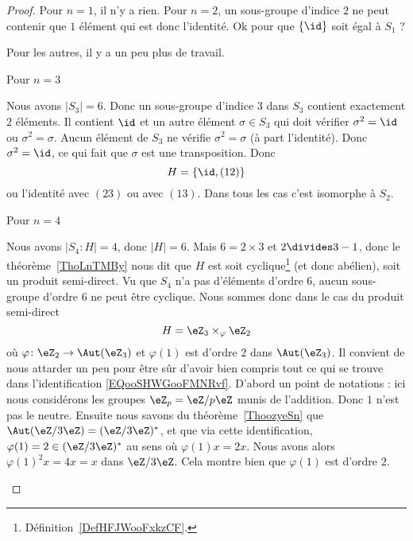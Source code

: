 \begin{proof}
    Pour \( n=1\), il n'y a rien. Pour \( n=2\), un sous-groupe d'indice \( 2\) ne peut contenir que \( 1\) élément qui est donc l'identité. Ok pour que \( \{ \id \}\) soit égal à \( S_1\) ?

    Pour les autres, il y a un peu plus de travail.

    \begin{subproof}
        \item[Pour \( n=3\)]

            Nous avons \( | S_3 |=6\). Donc un sous-groupe d'indice $3$ dans \( S_3\) contient exactement \( 2\) éléments. Il contient \( \id\) et un autre élément \( \sigma\in S_3\) qui doit vérifier \( \sigma^2=\id\) ou \( \sigma^2=\sigma\). Aucun élément de \( S_3\) ne vérifie \( \sigma^2=\sigma\) (à part l'identité). Donc \( \sigma^2=\id\), ce qui fait que \( \sigma\) est une transposition. Donc
            \begin{equation}
                H=\{ \id,(12) \}
            \end{equation}
            ou l'identité avec \( (23)\) ou avec \( (13)\). Dans tous les cas c'est isomorphe à \( S_2\).

        \item[Pour \( n=4\)]

            Nous avons \( | S_4:H |=4\), donc \( | H |=6\). Mais \( 6=2\times 3\) et \( 2\divides 3-1\), donc le théorème~\ref{ThoLnTMBy} nous dit que \( H\) est soit cyclique\footnote{Définition~\ref{DefHFJWooFxkzCF}.} (et donc abélien), soit un produit semi-direct. Vu que \( S_4\) n'a pas d'éléments d'ordre $6$, aucun sous-groupe d'ordre \( 6\) ne peut être cyclique. Nous sommes donc dans le cas du produit semi-direct
            \begin{equation}        \label{EQooSHWGooFMNRvf}
                H=\eZ_3\times_{\varphi}\eZ_2
            \end{equation}
            où \( \varphi\colon \eZ_2\to \Aut(\eZ_3)\) et \( \varphi(1)\) est d'ordre \( 2\) dans \( \Aut(\eZ_3)\). Il convient de nous attarder un peu pour être sûr d'avoir bien compris tout ce qui se trouve dans l'identification \eqref{EQooSHWGooFMNRvf}. D'abord un point de notations : ici nous considérons les groupes \( \eZ_p=\eZ/p\eZ\) munis de l'addition. Donc \( 1\) n'est pas le neutre. Ensuite nous savons du théorème~\ref{ThoozyeSn} que \( \Aut(\eZ/3\eZ)=(\eZ/3\eZ)^*\), et que via cette identification, \( \varphi(1)=2\in(\eZ/3\eZ)^*\) au sens où \( \varphi(1)x=2x\). Nous avons alors \( \varphi(1)^2x=4x=x\) dans \( \eZ/3\eZ\). Cela montre bien que \( \varphi(1)\) est d'ordre \( 2\).


\end{subproof}
\end{proof}
